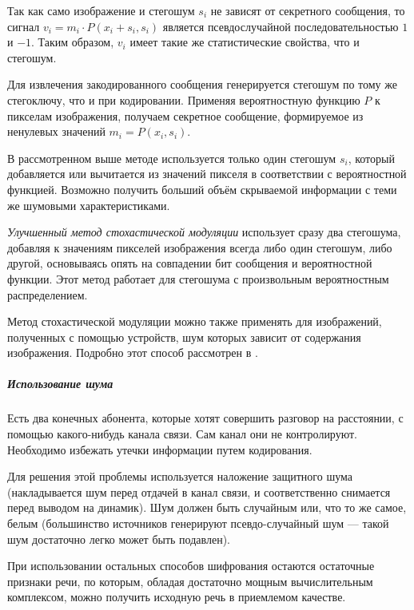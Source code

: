 Так как само изображение и стегошум $s_i$ не зависят от секретного сообщения,
то сигнал $v_i=m_i \cdot P(x_i+s_i,s_i)$ является псевдослучайной
последовательностью $1$ и $-1$. Таким образом, $v_i$ имеет такие же
статистические свойства, что и стегошум.

Для извлечения закодированного сообщения генерируется стегошум по тому же
стегоключу, что и при кодировании. Применяя вероятностную функцию $P$ к
пикселам изображения, получаем секретное сообщение, формируемое из ненулевых
значений $m_i = P(x_i,s_i)$.

В рассмотренном выше методе используется только один стегошум $s_i$, который
добавляется или вычитается из значений пикселя в соответствии с вероятностной
функцией. Возможно получить больший объём скрываемой информации с теми же
шумовыми характеристиками.

\emph{Улучшенный метод стохастической модуляции} использует сразу два
стегошума, добавляя к значениям пикселей изображения всегда либо один
стегошум, либо другой, основываясь опять на совпадении бит сообщения и
вероятностной функции. Этот метод работает для стегошума с произвольным
вероятностным распределением.

Метод стохастической модуляции можно также применять для изображений,
полученных с помощью устройств, шум которых зависит от содержания
изображения. Подробно этот способ рассмотрен в
\todo{[2]}. %






\subparagraph{Использование шума}
%
Есть два конечных абонента, которые хотят совершить разговор на расстоянии, с
помощью какого-нибудь канала связи. Сам канал они не контролируют. Необходимо
избежать утечки информации путем кодирования.

Для решения этой проблемы используется наложение защитного шума
(накладывается шум перед отдачей в канал связи, и соответственно снимается
перед выводом на динамик). Шум должен быть случайным или, что то же самое,
белым (большинство источников генерируют псевдо-случайный шум — такой шум
достаточно легко может быть подавлен).

При использовании остальных способов шифрования остаются остаточные признаки
речи, по которым, обладая достаточно мощным вычислительным комплексом, можно
получить исходную речь в приемлемом качестве.

